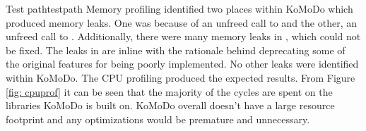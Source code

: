 {
		}{Test path}{testpath}
%
Memory profiling identified two places within KoMoDo which produced memory leaks. One was because of an unfreed call to  and the other, an unfreed call to . Additionally, there were many memory leaks in , which could not be fixed. The leaks in  are inline with the rationale behind deprecating some of the original features for being poorly implemented.
%
No other leaks were identified within KoMoDo.
%
The CPU profiling produced the expected results. From Figure \ref{fig: cpuprof} it can be seen that the majority of the cycles are spent on the libraries KoMoDo is built on. KoMoDo overall doesn't have a large resource footprint and any optimizations would be premature and unnecessary.

